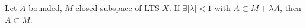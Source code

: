 Let $A$ bounded, $M$ closed subspace of LTS $X$. If $\exists|\lambda|<1$ with $A\subset M+\lambda A$, then $A\subset M$.
